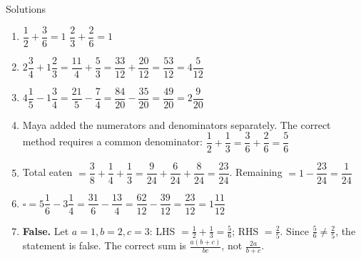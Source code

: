\documentclass{beamer}
\begin{document}
\begin{frame}{Solutions}
\vspace{-0.5em}
\small
\begin{enumerate}
  \item $\dfrac{1}{2} + \dfrac{3}{6} = 1$ \qquad $\dfrac{2}{3} + \dfrac{2}{6} = 1$

  \item $2\dfrac{3}{4} + 1\dfrac{2}{3} = \dfrac{11}{4} + \dfrac{5}{3} = \dfrac{33}{12} + \dfrac{20}{12} = \dfrac{53}{12} = 4\dfrac{5}{12}$

  \item $4\dfrac{1}{5} - 1\dfrac{3}{4} = \dfrac{21}{5} - \dfrac{7}{4} = \dfrac{84}{20} - \dfrac{35}{20} = \dfrac{49}{20} = 2\dfrac{9}{20}$

  \item Maya added the numerators and denominators separately. The correct method requires a common denominator:
  $\dfrac{1}{2} + \dfrac{1}{3} = \dfrac{3}{6} + \dfrac{2}{6} = \dfrac{5}{6}$

  \item Total eaten $= \dfrac{3}{8} + \dfrac{1}{4} + \dfrac{1}{3} = \dfrac{9}{24} + \dfrac{6}{24} + \dfrac{8}{24} = \dfrac{23}{24}$. \quad
  Remaining $= 1 - \dfrac{23}{24} = \dfrac{1}{24}$

  \item $\square = 5\dfrac{1}{6} - 3\dfrac{1}{4} = \dfrac{31}{6} - \dfrac{13}{4} = \dfrac{62}{12} - \dfrac{39}{12} = \dfrac{23}{12} = 1\dfrac{11}{12}$

  \item \textbf{False.} Let $a=1, b=2, c=3$: LHS $= \tfrac{1}{2} + \tfrac{1}{3} = \tfrac{5}{6}$; RHS $= \tfrac{2}{5}$. Since $\tfrac{5}{6} \neq \tfrac{2}{5}$, the statement is false. The correct sum is $\tfrac{a(b+c)}{bc}$, not $\tfrac{2a}{b+c}$.
\end{enumerate}
\end{frame}
\end{document}
